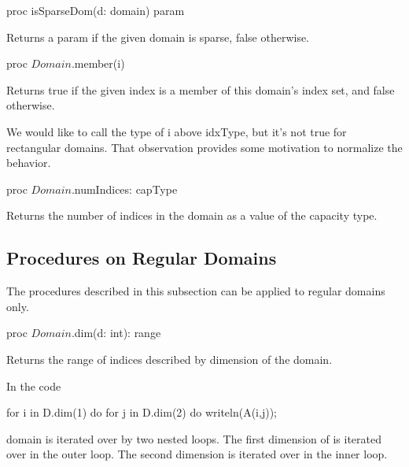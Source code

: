 \begin{protohead}
proc isSparseDom(d: domain) param
\end{protohead}
\begin{protobody}
Returns a param  if the given domain is sparse, false otherwise.
\end{protobody}

\begin{protohead}
proc $Domain$.member(i)
\end{protohead}
\begin{protobody}
Returns true if the given index  is a member of this domain's index set,
and false otherwise.
\end{protobody}

\begin{openissue}
We would like to call the type of i above idxType, but it's not true
for rectangular domains.  That observation provides some motivation to normalize
the behavior.
\end{openissue}

\begin{protohead}
proc $Domain$.numIndices: capType
\end{protohead}
\begin{protobody}
Returns the number of indices in the domain as a value of the capacity type.
\end{protobody}


\subsection{Procedures on Regular Domains}

The procedures described in this subsection can be applied to regular domains only.

\begin{protohead}
proc $Domain$.dim(d: int): range
\end{protohead}
\begin{protobody}
Returns the range of indices described by dimension  of the
domain.
\end{protobody}

\begin{example}
In the code
\begin{chapel}
for i in D.dim(1) do
  for j in D.dim(2) do
    writeln(A(i,j));
\end{chapel}
domain  is iterated over by two nested loops.  The first
dimension of  is iterated over in the outer loop.  The second
dimension is iterated over in the inner loop.
\end{example}

